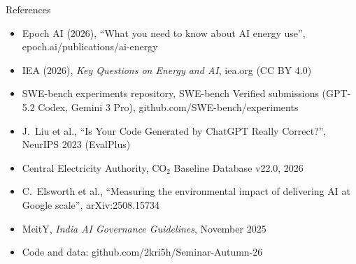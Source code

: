 \documentclass[aspectratio=169,11pt,t]{beamer}
\begin{document}
\begin{frame}{References}
\footnotesize
\begin{itemize}\setlength{\itemsep}{0.25em}
\item[{[1]}] Epoch AI (2026), ``What you need to know about AI energy use'', epoch.ai/publications/ai-energy
\item[{[2]}] IEA (2026), \emph{Key Questions on Energy and AI}, iea.org (CC BY 4.0)
\item[{[3]}] SWE-bench experiments repository, SWE-bench Verified submissions (GPT-5.2 Codex, Gemini 3 Pro), github.com/SWE-bench/experiments
\item[{[4]}] J.\ Liu et al., ``Is Your Code Generated by ChatGPT Really Correct?'', NeurIPS 2023 (EvalPlus)
\item[{[5]}] Central Electricity Authority, CO$_2$ Baseline Database v22.0, 2026
\item[{[6]}] C.\ Elsworth et al., ``Measuring the environmental impact of delivering AI at Google scale'', arXiv:2508.15734
\item[{[7]}] MeitY, \emph{India AI Governance Guidelines}, November 2025
\item[{[8]}] Code and data: github.com/2kri5h/Seminar-Autumn-26
\end{itemize}
\end{frame}
\end{document}
